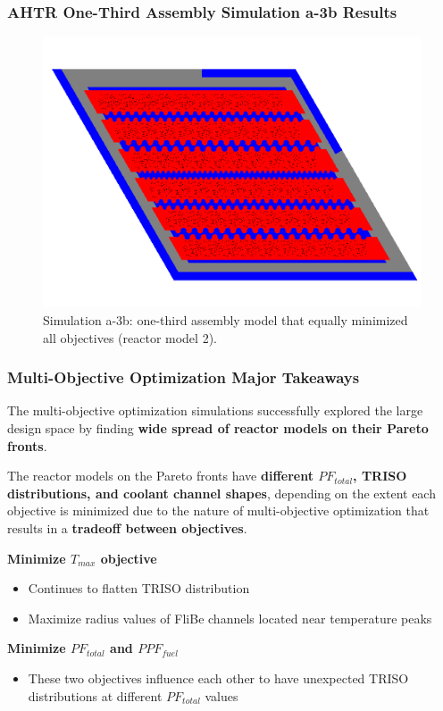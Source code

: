 \begin{frame}
    \frametitle{AHTR One-Third Assembly Simulation a-3b Results}
    \begin{figure}
        \includegraphics[width=0.75\linewidth]{../docs/figures/assem-obj-3-all-min-all.png} 
        \caption{Simulation a-3b: one-third assembly model that equally minimized all 
        objectives (reactor model 2).}
    \end{figure}
\end{frame}

\begin{frame}
    \frametitle{Multi-Objective Optimization Major Takeaways}
    The multi-objective optimization simulations successfully explored the large 
    design space by finding \textbf{wide spread of reactor models on their 
    Pareto fronts}. 

    \vspace{0.2cm}
    The reactor models on the Pareto fronts have \textbf{different $PF_{total}$, 
    TRISO distributions, and coolant channel shapes}, depending on the extent 
    each objective is minimized due to the nature of multi-objective
    optimization that results in a \textbf{tradeoff between objectives}. 

    \vspace{0.3cm}
    \textbf{Minimize $T_{max}$ objective} 
    \begin{itemize}
        \item Continues to flatten TRISO distribution 
        \item Maximize radius values of FliBe channels located near temperature peaks 
    \end{itemize}

    \textbf{Minimize $PF_{total}$ and $PPF_{fuel}$} 
    \begin{itemize}
    \item These two objectives influence each other to have unexpected TRISO
    distributions at different $PF_{total}$ values
    \end{itemize} 

\end{frame}

